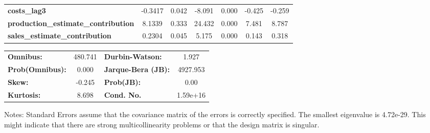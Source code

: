 \begin{center}
\begin{tabular}{lcccccc}
\textbf{costs\_lag3}                        &      -0.3417  &        0.042     &    -8.091  &         0.000        &       -0.425    &       -0.259     \\
\textbf{production\_estimate\_contribution} &       8.1339  &        0.333     &    24.432  &         0.000        &        7.481    &        8.787     \\
\textbf{sales\_estimate\_contribution}      &       0.2304  &        0.045     &     5.175  &         0.000        &        0.143    &        0.318     \\
\bottomrule
\end{tabular}
\begin{tabular}{lclc}
\textbf{Omnibus:}       & 480.741 & \textbf{  Durbin-Watson:     } &    1.927  \\
\textbf{Prob(Omnibus):} &   0.000 & \textbf{  Jarque-Bera (JB):  } & 4927.953  \\
\textbf{Skew:}          &  -0.245 & \textbf{  Prob(JB):          } &     0.00  \\
\textbf{Kurtosis:}      &   8.698 & \textbf{  Cond. No.          } & 1.59e+16  \\
\bottomrule
\end{tabular}
\end{center}

Notes: \newline
 [1] Standard Errors assume that the covariance matrix of the errors is correctly specified. \newline
 [2] The smallest eigenvalue is 4.72e-29. This might indicate that there are \newline
 strong multicollinearity problems or that the design matrix is singular.